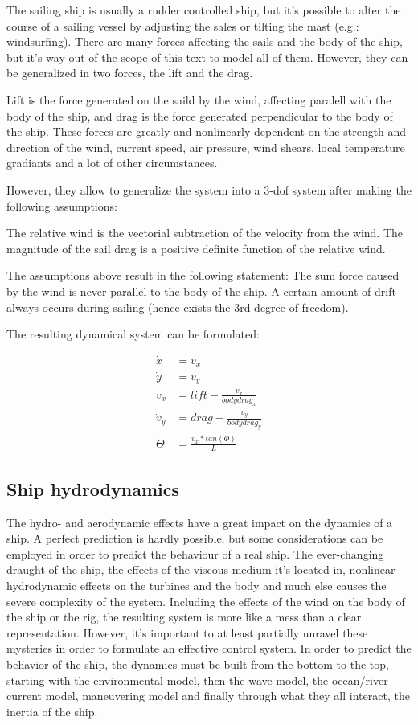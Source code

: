 The sailing ship is usually a rudder controlled ship, but it’s possible to alter the course of a sailing vessel by adjusting the sales or tilting the mast (e.g.: windsurfing).
There are many forces affecting the sails and the body of the ship, but it’s way out of the scope of this text to model all of them. However, they can be generalized in two forces, the lift and the drag.

Lift is the force generated on the saild by the wind, affecting paralell with the body of the ship, and drag is the force generated perpendicular to the body of the ship. These forces are greatly and nonlinearly dependent on the strength and direction of the wind, current speed, air pressure, wind shears, local temperature gradiants and a lot of other circumstances.

However, they allow to generalize the system into a 3-dof system after making the following assumptions:

The relative wind is the vectorial subtraction of the velocity from the wind.
The magnitude of the sail drag is a positive definite function of the relative wind.

The assumptions above result in the following statement:
The sum force caused by the wind is never parallel to the body of the ship. A certain amount of drift always occurs during sailing (hence exists the 3rd degree of freedom).

The resulting dynamical system can be formulated:

\begin{align}
		\dot{x} &= v_x
	\\	\dot{y} &= v_y
	\\	\dot{v}_x &= lift - \frac{v_x}{bodydrag_x}
	\\	\dot{v}_y &= drag - \frac{v_y}{bodydrag_y}
	\\	\dot{\Theta} &= \frac{v_x * tan(\Phi)}{L}
\end{align}

\subsection{Ship hydrodynamics}

The hydro- and aerodynamic effects have a great impact on the dynamics of a ship. A perfect prediction is hardly possible, but some considerations can be employed in order to predict the behaviour of a real ship.
The ever-changing draught of the ship, the effects of the viscous medium it’s located in, nonlinear hydrodynamic effects on the turbines and the body and much else causes the severe complexity of the system. Including the effects of the wind on the body of the ship or the rig, the resulting system is more like a mess than a clear representation.
However, it’s important to at least partially unravel these mysteries in order to formulate an effective control system. In order to predict the behavior of the ship, the dynamics must be built from the bottom to the top, starting with the environmental model, then the wave model, the ocean/river current model, maneuvering model and finally through what they all interact, the inertia of the ship.

